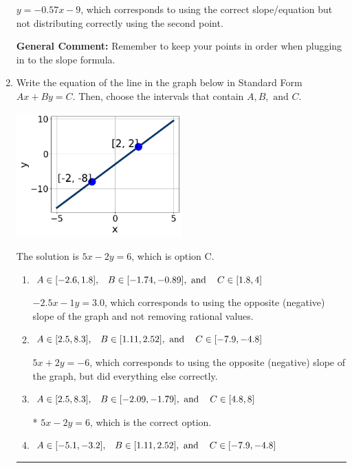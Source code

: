 \documentclass{extbook}[14pt]
\newcommand{\litem}[1]{\item #1

\rule{\textwidth}{0.4pt}}
\begin{document}
\begin{enumerate}
{\begin{enumerate}[label=\Alph*.]
 $y = -0.57x -9$, which corresponds to using the correct slope/equation but not distributing correctly using the second point.
\end{enumerate}

\textbf{General Comment:} Remember to keep your points in order when plugging in to the slope formula.
}
\litem{
Write the equation of the line in the graph below in Standard Form $Ax+By=C$. Then, choose the intervals that contain $A, B, \text{ and } C$.

\begin{center}
    \includegraphics[width=0.5\textwidth]{../Figures/linearGraphToStandardB.png}
\end{center}


The solution is \( 5x - 2y = 6 \), which is option C.\begin{enumerate}[label=\Alph*.]
\item \( A \in [-2.6, 1.8], \hspace{3mm} B \in [-1.74, -0.89], \text{ and } \hspace{3mm} C \in [1.8, 4] \)

 $-2.5x - 1y = 3.0$, which corresponds to using the opposite (negative) slope of the graph and not removing rational values.
\item \( A \in [2.5, 8.3], \hspace{3mm} B \in [1.11, 2.52], \text{ and } \hspace{3mm} C \in [-7.9, -4.8] \)

 $5x + 2y = -6$, which corresponds to using the opposite (negative) slope of the graph, but did everything else correctly.
\item \( A \in [2.5, 8.3], \hspace{3mm} B \in [-2.09, -1.79], \text{ and } \hspace{3mm} C \in [4.8, 8] \)

* $5x - 2y = 6$, which is the correct option.
\item \( A \in [-5.1, -3.2], \hspace{3mm} B \in [1.11, 2.52], \text{ and } \hspace{3mm} C \in [-7.9, -4.8] \)


\end{enumerate}}
\end{enumerate}
\end{document}
